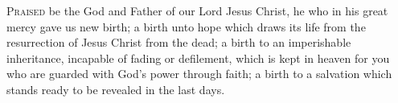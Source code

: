 
\lettrine{P}{raised} be the God and Father
of our Lord Jesus Christ,
he who in his great mercy
gave us new birth;
a birth unto hope which draws its life
from the resurrection of Jesus Christ from the dead;
a birth to an imperishable inheritance,
incapable of fading or defilement,
which is kept in heaven for you
who are guarded with God’s power through faith;
a birth to a salvation which stands ready
to be revealed in the last days.